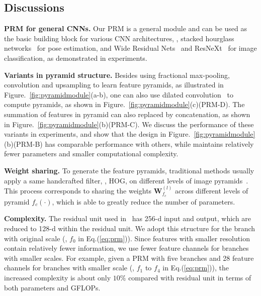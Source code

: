 \documentclass[10pt,twocolumn,letterpaper]{article}
\newcommand{\smalltitle}[1]{\vspace{0.2em}\noindent \textbf{{#1}}}
\newcommand{\W}{\mathbf{W}}
\begin{document}
\subsection{Discussions} 

\smalltitle{PRM for general CNNs. } Our PRM is a general  module and can be used as the basic building block for various CNN architectures, \eg, stacked hourglass networks~\cite{newell2016stacked} for pose estimation, and Wide Residual Nets~\cite{zagoruyko2016WRN} and ResNeXt~\cite{xie2016aggregated} for image classification, as demonstrated in experiments.


\smalltitle{Variants in pyramid structure. } Besides using fractional max-pooling, convolution and upsampling to learn feature pyramids, as illustrated in Figure.~\ref{fig:pyramidmodule}(a-b), one can also use dilated convolution~\cite{chen2016deeplab,yu2016multi} to compute pyramids, as shown in Figure.~\ref{fig:pyramidmodule}(c)(PRM-D). 
The summation of features in pyramid can also replaced by concatenation, as shown in Figure.~\ref{fig:pyramidmodule}(b)(PRM-C). 
We discuss the performance of these variants in experiments, and show that the design in Figure.~\ref{fig:pyramidmodule}(b)(PRM-B) has comparable performance with others, while maintains relatively fewer parameters and smaller computational complexity.  

\smalltitle{Weight sharing. }
To generate the feature pyramids, traditional methods usually apply a same handcrafted filter, \eg, HOG, on different levels of image pyramids~\cite{adelson1984pyramid,felzenszwalb2010object}. 
This process corresponds to sharing the weights $\W^{(l)}_{f_c}$ across different levels of pyramid $f_c(\cdot)$, which is able to greatly reduce the number of parameters.


\smalltitle{Complexity. }
The residual unit used in~\cite{newell2016stacked} has 256-d input and output, which are reduced to 128-d within the residual unit. 
We adopt this structure for the branch with original scale (\ie, $f_0$ in Eq.(\ref{eq:prm})). 
Since features with smaller resolution contain relatively fewer information, we use fewer feature channels for branches with smaller scales. 
For example, given a PRM with five branches and 28 feature channels for branches with smaller scale (\ie, $f_1$ to $f_4$ in Eq.(\ref{eq:prm})), the increased complexity is about only $10\%$ compared with residual unit in terms of both parameters and GFLOPs. 
\end{document}
